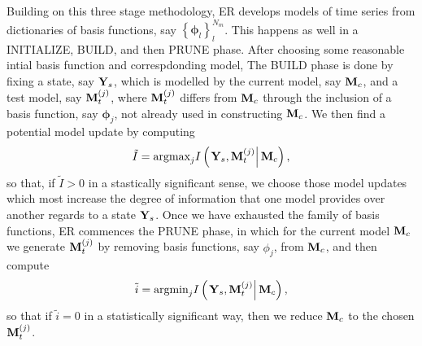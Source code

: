 \documentclass[a4paper,11pt]{article}
\begin{document}
Building on this three stage methodology, ER develops models of time series from dictionaries of basis functions, say $\left\{\mathbf{\phi}_{l}\right\}_{l}^{N_{m}}$.  This happens as well in a INITIALIZE, BUILD, and then PRUNE phase.  After choosing some reasonable intial basis function and correspdonding model, The BUILD phase is done by fixing a state, say ${\bf Y}_{s}$, which is modelled by the current model, say ${\bf M}_{c}$, and a test model, say ${\bf M}^{(j)}_{t}$, where ${\bf M}^{(j)}_{t}$ differs from ${\bf M}_{c}$ through the inclusion of a basis function, say $\mathbf{\phi}_{j}$, not already used in constructing ${\bf M}_{c}$.  We then find a potential model update by computing
\[
\tilde{I} = \text{argmax}_{j}I\left(\left.{\bf Y}_{s}, {\bf M}_{t}^{(j)}\right| {\bf M}_{c}\right),
\]
so that, if $\tilde{I}>0$ in a stastically significant sense, we choose those model updates which most increase the degree of information that one model provides over another regards to a state ${\bf Y}_{s}$.  Once we have exhausted the family of basis functions, ER commences the PRUNE phase, in which for the current model ${\bf M}_{c}$ we generate ${\bf M}_{t}^{(j)}$ by removing basis functions, say $\phi_{j}$, from ${\bf M}_{c}$, and then compute 
\[
\tilde{i} = \text{argmin}_{j}I\left(\left.{\bf Y}_{s}, {\bf M}_{t}^{(j)}\right| {\bf M}_{c}\right),
\]
so that if $\tilde{i}=0$ in a statistically significant way, then we reduce ${\bf M}_{c}$ to the chosen ${\bf M}_{t}^{(j)}$.  
\end{document}
